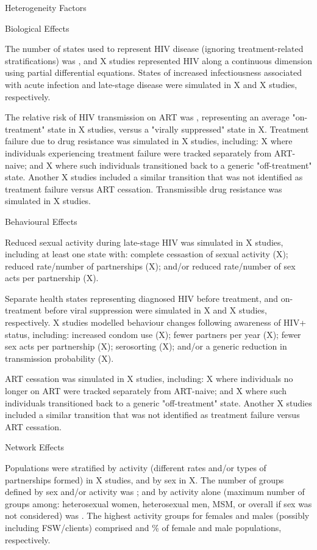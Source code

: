 Heterogeneity Factors

Biological Effects

The \xdmdef number of states used to represent HIV disease
(ignoring treatment-related stratifications) was ,
and X studies represented HIV along a continuous dimension
using partial differential equations.
States of increased infectiousness associated with acute infection and late-stage disease
were simulated in X and X studies, respectively.

The relative risk of HIV transmission on ART was ,
representing an average "on-treatment" state in X studies,
versus a "virally suppressed" state in X.
Treatment failure due to drug resistance was simulated in X studies, including:
X where individuals experiencing treatment failure
were tracked separately from ART-naive; and
X where such individuals
transitioned back to a generic "off-treatment" state.
Another X studies included a similar transition
that was not identified as treatment failure versus ART cessation.
Transmissible drug resistance was simulated in X studies.

Behavioural Effects

Reduced sexual activity during late-stage HIV was simulated in X studies,
including at least one state with:
complete cessastion of sexual activity (X);
reduced rate/number of partnerships (X); and/or
reduced rate/number of sex acts per partnership (X).

Separate health states representing diagnosed HIV before treatment,
and on-treatment before viral suppression were simulated in
X and X studies, respectively.
X studies modelled behaviour changes following awareness of HIV+ status, including:
increased condom use (X);
fewer partners per year (X);
fewer sex acts per partnership (X);
serosorting (X); and/or
a generic reduction in transmission probability (X).

ART cessation was simulated in X studies, including:
X where individuals no longer on ART
were tracked separately from ART-naive; and
X where such individuals
transitioned back to a generic "off-treatment" state.
Another X studies included a similar transition
that was not identified as treatment failure versus ART cessation.

Network Effects

Populations were stratified by activity (different rates and/or types of partnerships formed)
in X studies, and by sex in X.
The number of groups defined by sex and/or activity was ;
and by activity alone (maximum number of groups among:
heterosexual women, heterosexual men, MSM, or overall if sex was not considered) was .
The highest activity groups for females and males (possibly including FSW/clients) comprised
 and \% of female and male populations, respectively.

